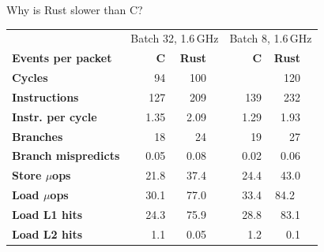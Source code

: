 \documentclass[NET,english,aspectratio=169,notitleframe]{tumbeamer}
\begin{document}
\begin{frame}{Why is Rust slower than C?}
\begin{table}[t]
 \setlength{\tabcolsep}{1.1mm}
	\centering
	\footnotesize
	\begin{tabular}{lrrrrrrrr}
		& \multicolumn{4}{c}{Batch 32, 1.6\,GHz} & \multicolumn{4}{c}{\color{TUMLightGray}Batch 8, 1.6\,GHz} \\
		\textbf{Events per packet} & \hspace{1em} & \textbf{C} & \textbf{Rust} & \hspace{2.5em} & & \color{TUMLightGray}\textbf{C} & \color{TUMLightGray}\textbf{Rust} & \hspace{1.5em} \\
		\toprule
		\textbf{Cycles}                     & & 94 & 100     &&& \color{TUMLightGray}{108} &  \color{TUMLightGray}120 \\
		\textbf{Instructions}              & & 127 & 209   &&& \color{TUMLightGray}139 &  \color{TUMLightGray}232  \\
		\textbf{Instr. per cycle}         & & 1.35 & 2.09 &&& \color{TUMLightGray}1.29 & \color{TUMLightGray}1.93 &  \vspace{0.35em}  \\
\color{TUMLightGray}		\textbf{Branches}                 & & \color{TUMLightGray}18 & \color{TUMLightGray}24      &&& \color{TUMLightGray}19 & \color{TUMLightGray} 27  \\
\color{TUMLightGray}		\textbf{Branch mispredicts} & & \color{TUMLightGray}0.05 &\color{TUMLightGray} 0.08       &&&\color{TUMLightGray} 0.02 &\color{TUMLightGray} 0.06 & 		\vspace{0.35em} \\
\color{TUMLightGray}		\textbf{Store $\mu$ops}       & & \color{TUMLightGray}21.8 &\color{TUMLightGray} 37.4      &&&\color{TUMLightGray} 24.4 & \color{TUMLightGray}43.0  \\
\color{TUMLightGray}		\textbf{Load $\mu$ops}       & & \color{TUMLightGray}30.1 &\color{TUMLightGray} 77.0      &&& \color{TUMLightGray}33.4 &\color{TUMLightGray} 84.2\  \\
\color{TUMLightGray}		\textbf{Load L1 hits}                     & & \color{TUMLightGray}24.3 &\color{TUMLightGray} 75.9      &&& \color{TUMLightGray}28.8 & \color{TUMLightGray}83.1 \\
\color{TUMLightGray}		\textbf{Load L2 hits}                     & & \color{TUMLightGray}1.1 &\color{TUMLightGray} 0.05         &&& \color{TUMLightGray}1.2 &\color{TUMLightGray} 0.1 \\

\end{tabular}
\end{table}
\end{frame}
\end{document}
